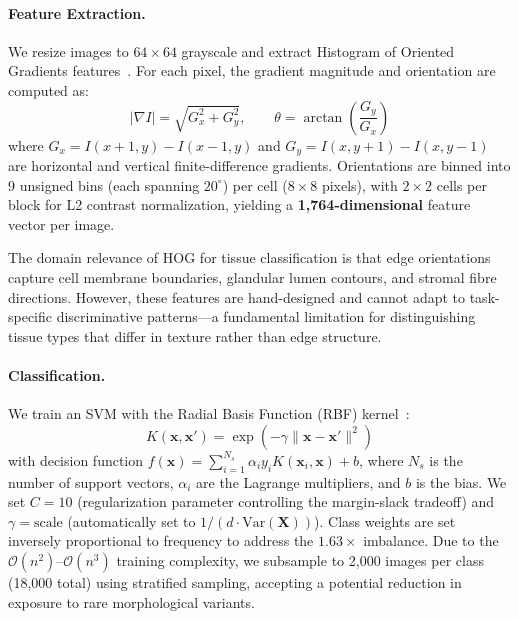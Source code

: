 \documentclass{article}
\begin{document}
\paragraph{Feature Extraction.}
We resize images to $64 \times 64$ grayscale and extract Histogram of Oriented Gradients features~\citep{dalal2005histograms}. For each pixel, the gradient magnitude and orientation are computed as:
\begin{equation}
    |\nabla I| = \sqrt{G_x^2 + G_y^2}, \qquad
    \theta = \arctan\left(\frac{G_y}{G_x}\right)
    \label{eq:hog}
\end{equation}
where $G_x = I(x+1, y) - I(x-1, y)$ and $G_y = I(x, y+1) - I(x, y-1)$ are horizontal and vertical finite-difference gradients. Orientations are binned into 9 unsigned bins (each spanning $20^{\circ}$) per cell ($8 \times 8$ pixels), with $2 \times 2$ cells per block for L2 contrast normalization, yielding a \textbf{1,764-dimensional} feature vector per image.

The domain relevance of HOG for tissue classification is that edge orientations capture cell membrane boundaries, glandular lumen contours, and stromal fibre directions. However, these features are hand-designed and cannot adapt to task-specific discriminative patterns---a fundamental limitation for distinguishing tissue types that differ in texture rather than edge structure.

\paragraph{Classification.}
We train an SVM with the Radial Basis Function (RBF) kernel~\citep{cortes1995support}:
\begin{equation}
    K(\mathbf{x}, \mathbf{x}') = \exp\left(-\gamma \|\mathbf{x} - \mathbf{x}'\|^2\right)
    \label{eq:rbf}
\end{equation}
with decision function $f(\mathbf{x}) = \sum_{i=1}^{N_s} \alpha_i y_i K(\mathbf{x}_i, \mathbf{x}) + b$, where $N_s$ is the number of support vectors, $\alpha_i$ are the Lagrange multipliers, and $b$ is the bias. We set $C = 10$ (regularization parameter controlling the margin-slack tradeoff) and $\gamma = \text{scale}$ (automatically set to $1 / (d \cdot \text{Var}(\mathbf{X}))$). Class weights are set inversely proportional to frequency to address the $1.63\times$ imbalance. Due to the $\mathcal{O}(n^2)$--$\mathcal{O}(n^3)$ training complexity, we subsample to 2,000 images per class (18,000 total) using stratified sampling, accepting a potential reduction in exposure to rare morphological variants.
\end{document}

